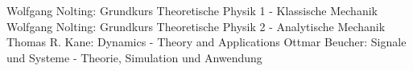 \documentclass{article}
\begin{document}










\newpage
\begin{thebibliography}{\hspace{0.5cm}}
	 Wolfgang Nolting: Grundkurs Theoretische Physik 1 - Klassische Mechanik
	 Wolfgang Nolting: Grundkurs Theoretische Physik 2 - Analytische Mechanik
	 Thomas R. Kane: Dynamics - Theory and Applications
	 Ottmar Beucher: Signale und Systeme - Theorie, Simulation und Anwendung

\end{thebibliography}
\end{document}
